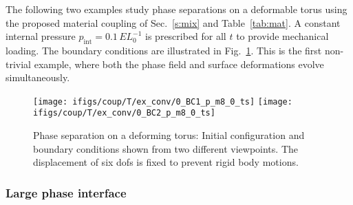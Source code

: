 \documentclass[11pt]{article}
\begin{document}
The following two examples study phase separations on a deformable torus using the proposed material coupling of Sec.~\ref{s:mix} and Table~\ref{tab:mat}. 
A constant internal pressure $p_{\mathrm{int}}=0.1\,EL_0^{-1}$ is prescribed for all $t$ to provide mechanical loading. 
The boundary conditions are illustrated in Fig.~\ref{fig:t_IC1}. 
This is the first non-trivial example, where both the phase field and surface deformations evolve simultaneously. 
\begin{figure}[H]
\centering
\texttt{[image: ifigs/coup/T/ex\_conv/0\_BC1\_p\_m8\_0\_ts]}\hspace{4mm}
\texttt{[image: ifigs/coup/T/ex\_conv/0\_BC2\_p\_m8\_0\_ts]}
\caption{Phase separation on a deforming torus: Initial configuration and boundary conditions shown from two different viewpoints. 
The displacement of six dofs is fixed to prevent rigid body motions.
}
\label{fig:t_IC1}
\end{figure}

\subsubsection{Large phase interface}\label{Sec:ex1}
\end{document}
